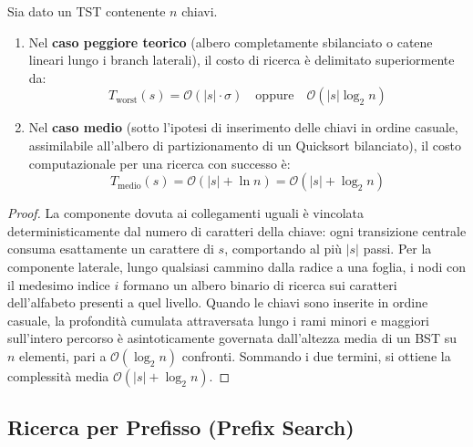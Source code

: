 \begin{theorem}
\label{thm:complessita-ricerca-tst}
Sia dato un TST contenente $n$ chiavi.
\begin{enumerate}
  \item Nel \textbf{caso peggiore teorico} (albero completamente sbilanciato o catene lineari lungo i branch laterali), il costo di ricerca \`e delimitato superiormente da:
  \begin{equation}
    T_{\text{worst}}(s) = \mathcal{O}(|s| \cdot \sigma) \quad \text{oppure} \quad \mathcal{O}(|s| \log_2 n)
  \end{equation}
  \item Nel \textbf{caso medio} (sotto l'ipotesi di inserimento delle chiavi in ordine casuale, assimilabile all'albero di partizionamento di un Quicksort bilanciato), il costo computazionale per una ricerca con successo \`e:
  \begin{equation}
    T_{\text{medio}}(s) = \mathcal{O}(|s| + \ln n) = \mathcal{O}(|s| + \log_2 n)
  \end{equation}
\end{enumerate}
\end{theorem}

\begin{proof}
La componente dovuta ai collegamenti uguali \`e vincolata deterministicamente dal numero di caratteri della chiave: ogni transizione centrale consuma esattamente un carattere di $s$, comportando al pi\`u $|s|$ passi. Per la componente laterale, lungo qualsiasi cammino dalla radice a una foglia, i nodi con il medesimo indice $i$ formano un albero binario di ricerca sui caratteri dell'alfabeto presenti a quel livello. Quando le chiavi sono inserite in ordine casuale, la profondit\`a cumulata attraversata lungo i rami minori e maggiori sull'intero percorso \`e asintoticamente governata dall'altezza media di un BST su $n$ elementi, pari a $\mathcal{O}(\log_2 n)$ confronti. Sommando i due termini, si ottiene la complessit\`a media $\mathcal{O}(|s| + \log_2 n)$.
\end{proof}

\FloatBarrier
\subsection{Ricerca per Prefisso (Prefix Search)}
\label{subsec:ricerca-prefisso-tst}

